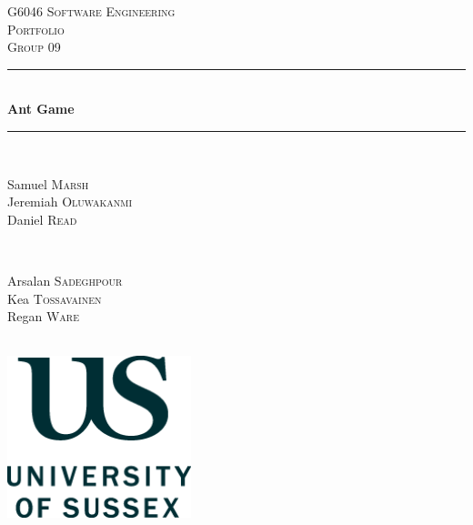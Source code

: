 \documentclass[12pt]{article}
\begin{document}
\begin{titlepage}

\newcommand{\HRule}{\rule{\linewidth}{0.5mm}}

\center

\textsc{\LARGE G6046 Software Engineering}\\[1.5cm]
\textsc{\Large Portfolio}\\[0.5cm]
\textsc{\large Group 09}\\[0.5cm]

\HRule \\[0.4cm]
{ \huge \bfseries Ant Game}\\[0.4cm] 
\HRule \\[1.5cm]

\begin{minipage}{0.4\textwidth}
\center
\begin{flushleft} \large
Samuel \textsc{Marsh}\\
Jeremiah \textsc{Oluwakanmi}\\
Daniel \textsc{Read}
\end{flushleft}
\end{minipage}
~
\begin{minipage}{0.4\textwidth}
\begin{flushright} \large
Arsalan \textsc{Sadeghpour}\\
Kea \textsc{Tossavainen}\\
Regan \textsc{Ware}
\end{flushright}
\end{minipage}\\[2cm]

\includegraphics[width=0.4\textwidth]{images/sussex-logo.png}\\[1cm]

\vfill

\end{titlepage}
\end{document}
